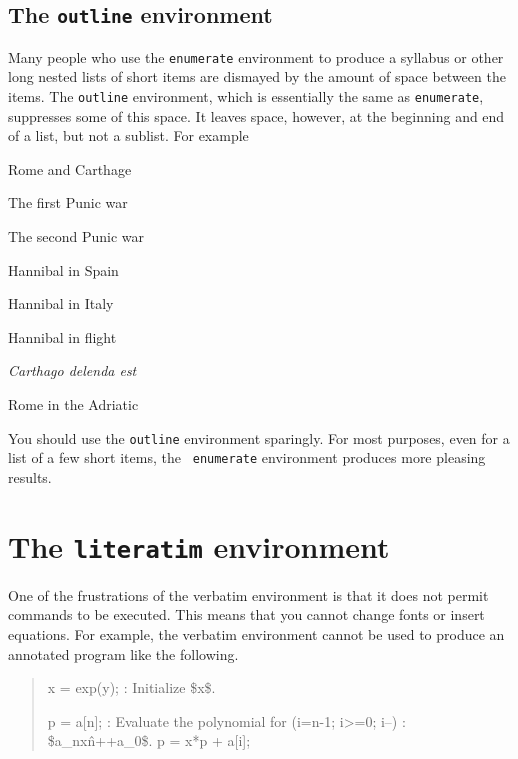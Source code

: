 \subsection{The {\tt outline} environment}

Many people who use the {\tt enumerate} environment to produce a
syllabus or other long nested lists of short items are dismayed
by the amount of space between the items.  The {\tt outline}
environment, which is essentially the same as {\tt enumerate},
suppresses some of this space.  It leaves space, however, at the
beginning and end of a list, but not a sublist.  For example
\begin{outline}
\item Rome and Carthage
   \begin{outline}
   \item The first Punic war
   \item The second Punic war
      \begin{outline}
      \item Hannibal in Spain
      \item Hannibal in Italy
      \item Hannibal in flight
      \end{outline}
   \item {\it Carthago delenda est}
   \end{outline}
\item Rome in the Adriatic
\end{outline}
You should use the {\tt outline} environment sparingly.  For
most purposes, even for a list of a few short items, the {\tt
enumerate} environment produces more pleasing results.

\section{The {\tt literatim} environment}
One of the frustrations of the verbatim environment is that it does
not permit commands to be executed.  This means that you cannot
change fonts or insert equations.  For example, the verbatim
environment cannot be used to produce an annotated program like the
following.
\begin{quote}
\begin{literatim}{}
x = exp(y);                 {\rm: Initialize \$x\$.}

p = a[n];                   {\rm: Evaluate the polynomial}
for (i=n-1; i>=0; i--)      {\rm: \$a\_nx\^n+\cdots+a\_0\$.} 
   p = x*p + a[i];
\end{literatim}
\end{quote}


